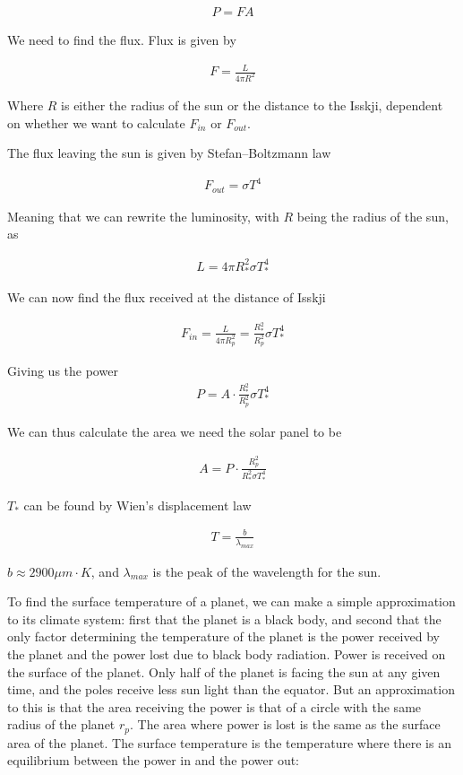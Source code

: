 \documentclass[a4paper, 10pt]{article}
\begin{document}
\begin{align}
P = FA
\end{align}

We need to find the flux. Flux is given by

\begin{align}
F = \frac{L}{4\pi R^2}
\end{align}

Where $R$ is either the radius of the sun or the distance to the Isskji, dependent on whether we want to calculate $F_{in}$ or $F_{out}$.

The flux leaving the sun is given by Stefan–Boltzmann law

\begin{align*}
F_{out} = \sigma T^4
\end{align*}

Meaning that we can rewrite the luminosity, with $R$ being the radius of the sun, as

\begin{align}
L = 4\pi R_*^2 \sigma T_*^4
\end{align}

We can now find the flux received at the distance of Isskji


\begin{align}
F_{in} = \frac{L}{4\pi R_p^2} = \frac{R_*^2}{R_p^2} \sigma T_*^4
\end{align}

Giving us the power
\begin{align}
P = A \cdot \frac{R_*^2}{R_p^2} \sigma T_*^4
\end{align}

We can thus calculate the area we need the solar panel to be

\begin{align}\label{eq:area}
A = P \cdot \frac{R_p^2}{R_*^2 \sigma T_*^4} 
\end{align}

$T_*$ can be found by Wien's displacement law

\begin{align}
T = \frac{b}{\lambda_{max}}
\end{align}

$b \approx 2900 \mu m \cdot K$, and $\lambda_{max}$ is the peak of the wavelength for the sun.

To find the surface temperature of a planet, we can make a simple approximation to its climate system: first that the planet is a black body, and second that the only factor determining the temperature of the planet is the power received by the planet and the power lost due to black body radiation. Power is received on the surface of the planet. Only half of the planet is facing the sun at any given time, and the poles receive less sun light than the equator. But an approximation to this is that the area receiving the power is that of a circle with the same radius of the planet $r_p$. The area where power is lost is the same as the surface area of the planet. The surface temperature is the temperature where there is an equilibrium between the power in and the power out:
\end{document}
